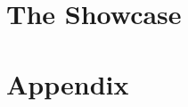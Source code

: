 \documentclass[ twoside,openright,titlepage,numbers=noenddot,headinclude,%
                footinclude=true,cleardoublepage=empty,abstractoff, %
                BCOR=5mm,paper=a4,fontsize=11pt,%
                ngerman,american,%
                ]{scrreprt}
\begin{document}
\part{The Showcase}





\appendix
\cleardoublepage
\part{Appendix}

\cleardoublepage
\cleardoublepage
\cleardoublepage
\end{document}
